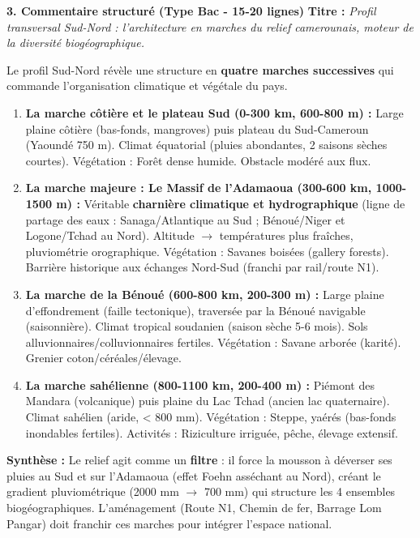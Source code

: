 \documentclass[11pt]{article}
\begin{document}
\begin{exoresolu}
\textbf{3. Commentaire structuré (Type Bac - 15-20 lignes)}
\textbf{Titre :} \emph{Profil transversal Sud-Nord : l'architecture en marches du relief camerounais, moteur de la diversité biogéographique.}

Le profil Sud-Nord révèle une structure en \textbf{quatre marches successives} qui commande l'organisation climatique et végétale du pays.
\begin{enumerate}
    \item \textbf{La marche côtière et le plateau Sud (0-300 km, 600-800 m) :} Large plaine côtière (bas-fonds, mangroves) puis plateau du Sud-Cameroun (Yaoundé 750 m). Climat équatorial (pluies abondantes, 2 saisons sèches courtes). Végétation : Forêt dense humide. Obstacle modéré aux flux.
    \item \textbf{La marche majeure : Le Massif de l'Adamaoua (300-600 km, 1000-1500 m) :} Véritable \textbf{charnière climatique et hydrographique} (ligne de partage des eaux : Sanaga/Atlantique au Sud ; Bénoué/Niger et Logone/Tchad au Nord). Altitude $\rightarrow$ températures plus fraîches, pluviométrie orographique. Végétation : Savanes boisées (gallery forests). Barrière historique aux échanges Nord-Sud (franchi par rail/route N1).
    \item \textbf{La marche de la Bénoué (600-800 km, 200-300 m) :} Large plaine d'effondrement (faille tectonique), traversée par la Bénoué navigable (saisonnière). Climat tropical soudanien (saison sèche 5-6 mois). Sols alluvionnaires/colluvionnaires fertiles. Végétation : Savane arborée (karité). Grenier coton/céréales/élevage.
    \item \textbf{La marche sahélienne (800-1100 km, 200-400 m) :} Piémont des Mandara (volcanique) puis plaine du Lac Tchad (ancien lac quaternaire). Climat sahélien (aride, < 800 mm). Végétation : Steppe, yaérés (bas-fonds inondables fertiles). Activités : Riziculture irriguée, pêche, élevage extensif.
\end{enumerate}
\textbf{Synthèse :} Le relief agit comme un \textbf{filtre} : il force la mousson à déverser ses pluies au Sud et sur l'Adamaoua (effet Foehn asséchant au Nord), créant le gradient pluviométrique (2000 mm $\rightarrow$ 700 mm) qui structure les 4 ensembles biogéographiques. L'aménagement (Route N1, Chemin de fer, Barrage Lom Pangar) doit franchir ces marches pour intégrer l'espace national.
\end{exoresolu}
\end{document}
